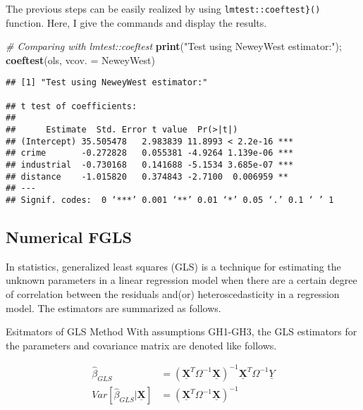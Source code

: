 \documentclass[
  12pt,
]{article}
\newenvironment{Shaded}{\begin{snugshade}}{\end{snugshade}}
\newcommand{\CommentTok}[1]{\textcolor[rgb]{0.56,0.35,0.01}{\textit{#1}}}
\newcommand{\DataTypeTok}[1]{\textcolor[rgb]{0.13,0.29,0.53}{#1}}
\newcommand{\KeywordTok}[1]{\textcolor[rgb]{0.13,0.29,0.53}{\textbf{#1}}}
\newcommand{\NormalTok}[1]{#1}
\newcommand{\StringTok}[1]{\textcolor[rgb]{0.31,0.60,0.02}{#1}}
\begin{document}
The previous steps can be easily realized by using \texttt{lmtest::coeftest\}()} function. Here, I give the commands and display the results.

\begin{Shaded}
\begin{Highlighting}[]
\CommentTok{\# Comparing with lmtest::coeftest }
\KeywordTok{print}\NormalTok{(}\StringTok{"Test using NeweyWest estimator:"}\NormalTok{); }\KeywordTok{coeftest}\NormalTok{(ols, }\DataTypeTok{vcov. =}\NormalTok{ NeweyWest)}
\end{Highlighting}
\end{Shaded}

\begin{Verbatim}
## [1] "Test using NeweyWest estimator:"

## t test of coefficients:
## 
##      Estimate  Std. Error t value  Pr(>|t|)    
## (Intercept) 35.505478   2.983839 11.8993 < 2.2e-16 ***
## crime       -0.272828   0.055381 -4.9264 1.139e-06 ***
## industrial  -0.730168   0.141688 -5.1534 3.685e-07 ***
## distance    -1.015820   0.374843 -2.7100  0.006959 ** 
## ---
## Signif. codes:  0 ‘***’ 0.001 ‘**’ 0.01 ‘*’ 0.05 ‘.’ 0.1 ‘ ’ 1
\end{Verbatim}

\hypertarget{numerical-fgls}{%
\subsection{Numerical FGLS}\label{numerical-fgls}}

In statistics, generalized least squares (GLS) is a technique for estimating the unknown parameters in a linear regression model when there are a certain degree of correlation between the residuals and(or) heteroscedasticity in a regression model. The estimators are summarized as follows.

\begin{itembox}[1]{Esitmators of GLS Method}
With assumptions GH1-GH3, the GLS estimators for the parameters and covariance matrix are denoted like follows.

\begin{align*}
    \hat{\beta}_{GLS} & = \left(\underline{\mathbf{X}}^{T} \Omega^{-1} \underline{\mathbf{X}} \right)^{-1} \underline{\mathbf{X}}^{T} \Omega^{-1} \underline{Y}\\
    Var[\hat{\beta}_{GLS} | \underline{\mathbf{X}}] & = \left(\underline{\mathbf{X}}^{T} \Omega^{-1} \underline{\mathbf{X}} \right)^{-1}
\end{align*}

\end{itembox}
\end{document}
